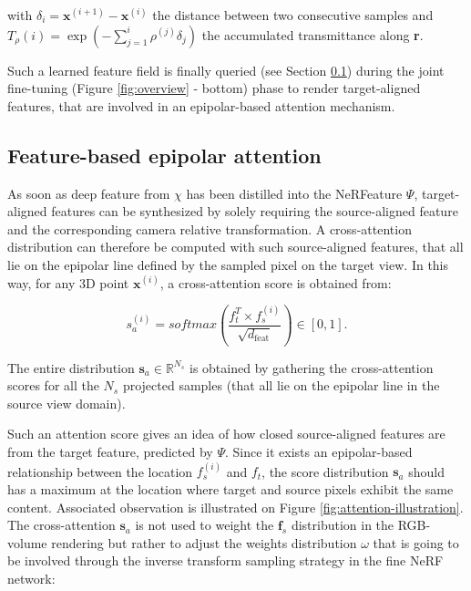 with $\delta_{i}=\mathbf{x}^{(i+1)}-\mathbf{x}^{(i)}$  the distance between two consecutive samples and $T_{\rho}(i) = \exp\left(-\sum_{j=1}^{i}\rho^{(j)}\delta_{j}\right)$ the accumulated transmittance along \textbf{r}.

 Such a learned feature field is finally queried (see Section \ref{subsec:epinerf/method/epipolar_att}) during the joint fine-tuning (Figure \ref{fig:overview} - bottom) phase to render target-aligned features, that are involved in an epipolar-based attention mechanism. 
 
\subsection{Feature-based epipolar attention}
\label{subsec:epinerf/method/epipolar_att}
As soon as deep feature from $\chi$ has been distilled into the NeRFeature $\Psi$, target-aligned features can be synthesized by solely requiring the source-aligned feature and the corresponding camera relative transformation. A cross-attention distribution \citep{vaswani2017attention} can therefore be computed with such source-aligned features, that all lie on the epipolar line defined by the sampled pixel on the target view. In this way, for any 3D point $\mathbf{x}^{(i)}$, a cross-attention score is obtained from: 

\begin{equation}
    s_{a}^{(i)} = softmax\left(\frac{f_{t}^{T}\times f_{s}^{(i)}}{\sqrt{d_{\text{feat}}}}\right) \in [0,1].
\label{eq:attention}
\end{equation}

The entire distribution $\textbf{s}_{a} \in \mathbb{R}^{N_{s}}$ is obtained by gathering the cross-attention scores for all the $N_s$ projected samples (that all lie on the epipolar line in the source view domain). 

Such an attention score gives an idea of how closed source-aligned features are from the target feature, predicted by $\Psi$. Since it exists an epipolar-based relationship between the location $f_{s}^{(i)}$ and $f_{t}$, the score distribution $\mathbf{s}_{a}$ should has a maximum at the location where target and source pixels exhibit the same content. Associated observation is illustrated on Figure \ref{fig:attention-illustration}. The cross-attention $\mathbf{s}_{a}$ is not used to weight the $\mathbf{f}_{s}$ distribution in the RGB-volume rendering \citep{max1995optical} but rather to adjust the weights distribution $\omega$ that is going to be involved through the inverse transform sampling strategy \citep{mildenhall2020nerf} in the fine NeRF network: 

